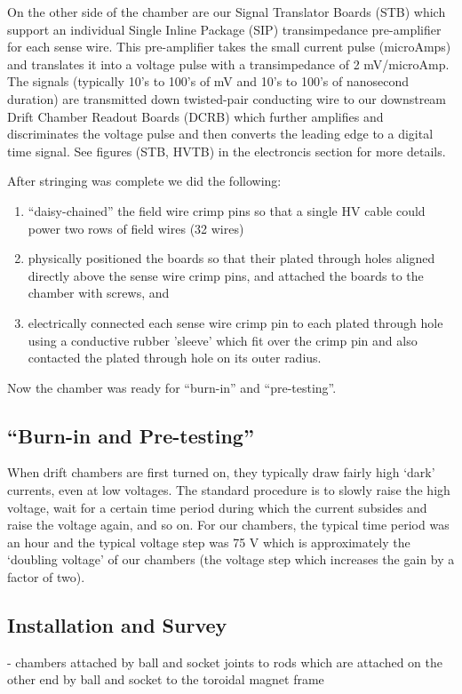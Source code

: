 On the other side of the chamber are our Signal Translator Boards (STB) 
which support an individual Single Inline Package (SIP) transimpedance
pre-amplifier for each sense wire.  This pre-amplifier takes the
small current pulse (microAmps) and translates it into a voltage 
pulse with a transimpedance of 2 mV/microAmp.  The signals (typically
10's to 100's of mV and 10's to 100's of nanosecond duration) are
transmitted down twisted-pair conducting wire to our downstream
Drift Chamber Readout Boards (DCRB) which further amplifies and
discriminates the voltage pulse and then converts the leading edge
to a digital time signal.
See figures (STB, HVTB) in the electroncis section for more details.

After stringing was complete we did the following:
\begin{enumerate}
\item ``daisy-chained'' the field wire crimp pins so that a single
HV cable could power two rows of field wires (32 wires)
\item physically positioned the boards so that their plated through
holes aligned directly above the sense wire crimp pins, and attached
the boards to the chamber with screws, and
\item electrically connected each sense wire crimp pin to each
plated through hole using a conductive rubber 'sleeve' which fit
over the crimp pin and also contacted the plated through hole on
its outer radius.
\end{enumerate}

Now the chamber was ready for ``burn-in'' and ``pre-testing''.

\subsection{``Burn-in and Pre-testing''}
When drift chambers are first turned on, they typically draw fairly high
`dark' currents, even at low voltages.  The standard procedure is to
slowly raise the high voltage, wait for a certain time period during
which the current subsides and raise the voltage again, and so on.
For our chambers, the typical time period was an hour and the typical
voltage step was 75 V which is approximately the `doubling voltage' of
our chambers (the voltage step which increases the gain by a factor
of two).

\subsection{Installation and Survey}
- chambers attached by ball and socket joints to rods which are attached
on the other end by ball and socket to the toroidal magnet frame



